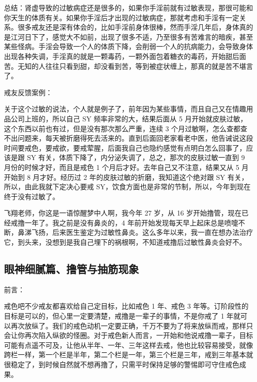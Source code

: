 总结：肾虚导致的过敏病症还是很多的，如果你手淫前就有过敏表现，那很可能和你天生的体质有关。如果你手淫后才出现的过敏病症，那就考虑和手淫有一定关系。很多戒友还是深有体会的，比如手淫前身体很棒，然而手淫几年后，身体真的是江河日下了，感觉大不如前，出现了很多不适，乃至很多有苦难言的暗疾，甚至某些怪病。手淫会导致一个人的体质下降，会削弱一个人的抗病能力，会导致身体出现各种失调，手淫真的就是一颗毒药，一颗外面包着糖衣的毒药，开始甜后面苦。无知的人往往只看到甜，却没看到苦，等到被症状缠上，那真的就是苦不堪言了。

戒友反馈案例：

\begin{case}[过敏]
    关于这个过敏的说法，个人就是例子了，前年因为某些事情，而且自己又在情趣用品公司上班的，所以自己 SY 频率非常的大，结果后面从 5 月开始就皮肤过敏，这个东西以前也有过，但是没有那次那么严重，连续 3 个月过敏啊，怎么查都查不出问题来，每天被折磨得死去活来的。直到后面回老家看老中医，他告诫说这段时间要戒色，要戒欲，要戒荤腥，后面我自己也隐约感觉有点明白怎么回事了，应该是跟 SY 有关，体质下降了，内分泌失调了，总之，那次的皮肤过敏一直到 9 月份的时候才好，而且是戒色 1 个月后才好。去年自己又不注意，结果又从 5 月开始到 8 月才好。经历过 2 年的皮肤过敏的折磨，我知道这个绝对跟 SY 有关，所以，由此我就下定决心要戒 SY，饮食方面也是非常的节制，所以，今年到现在终于没有过敏了。
\end{case}

\begin{case}[过敏]
    飞翔老师，你这是一语惊醒梦中人啊，我今年 27 岁，从 16 岁开始撸管，现在已经戒撸一年了。我之前是没有鼻炎的，4 年前开始发现每天早上起床总是喷嚏不断，鼻涕飞扬，后来医生鉴定为过敏性鼻炎。这么多年以来，我一直在想办法治疗它，到头来，没想到是我自己埋下的祸根啊，不知道戒撸后过敏性鼻炎会好不。
\end{case}

\subsection{眼神细腻篇、撸管与抽筋现象}

前言：

戒色吧不少戒友都喜欢给自己定目标，比如戒色 1 年、戒色 3 年等。订阶段性的目标是可以的，但心里一定要清楚，戒撸是一辈子的事情，不是你戒了 1 年就可以再次放纵了。我们的戒色动机一定要正确，千万不要为了将来放纵而戒，那样只会让你再次陷入纵欲的怪圈。对于戒色新人而言，一开始和他说戒撸一辈子，目标可能有点遥不可及，让他从半年、一年、三年这样去戒，他也比较容易接受，就像跨栏一样，第一个栏是半年，第二个栏是一年，第三个栏是三年，戒到三年基本就很稳定了，到时候自然就不想再撸了，只需平时保持足够的警惕即可守住戒色成果。

